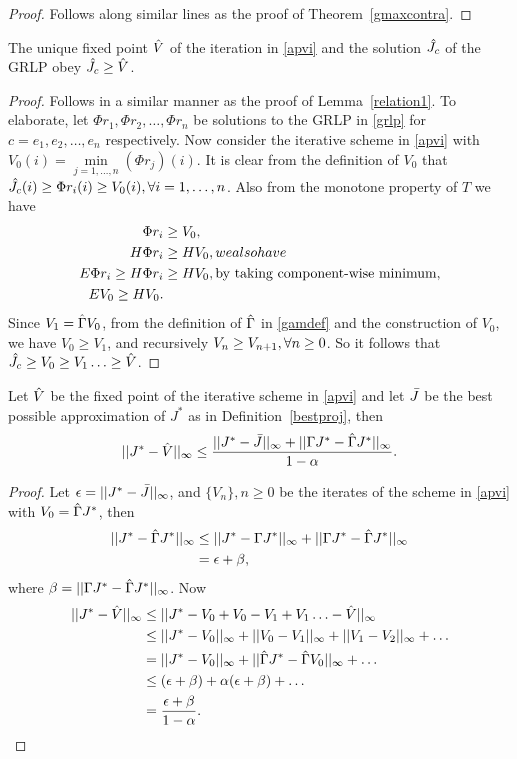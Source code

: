 \documentclass[12pt,draftcls,onecolumn]{IEEEtran}
\begin{document}
\begin{proof}
Follows along similar lines as the proof of Theorem~\ref{gmaxcontra}.
\end{proof}
\begin{lemma}\label{relation2}
The unique fixed point $\hat{V}$ of the iteration in \eqref{apvi} and the solution $\hat{J}_c$ of the GRLP obey $\hat{J}_c\geq\hat{V}$.
\end{lemma}
\begin{proof}
Follows in a similar manner as the proof of Lemma~\ref{relation1}. To elaborate, let $\Phi r_1, \Phi r_2,\ldots,\Phi r_n$ be solutions to the GRLP in \eqref{grlp} for $c=e_1, e_2,\ldots,e_n$ respectively. Now consider the iterative scheme in \eqref{apvi} with $V_0(i)=\underset{j=1,\ldots,n}{\min}(\Phi r_j)(i)$. It is clear from the definition of $V_0$ that $\hat{J}_c(i)\geq\Phi r_i(i)\geq V_0(i), \relax{ } \forall i=1,\ldots,n$. Also from the monotone property of $T$ we have 
\begin{align}
\Phi r_i&\geq V_0,\nonumber\\
H\Phi r_i&\geq H V_0,\relax{we also have}\nonumber\\
E\Phi r_i\geq H\Phi r_i&\geq HV_0,\relax{ }\text{by taking component-wise minimum},\nonumber\\
E V_0\geq H V_0.
\end{align}
Since $V_1=\hat{\Gamma} V_0$, from the definition of $\hat{\Gamma}$ in \eqref{gamdef} and the construction of $V_0$, we have $V_0\geq V_1$, and recursively $V_{n}\geq V_{n+1}, \relax{ }\forall n\geq 0$. So it follows that $\hat{J}_c\geq V_0\geq V_1\ldots\geq \hat{V}$.
\end{proof}
\begin{theorem}\label{mt1}
Let $\hat{V}$ be the fixed point of the iterative scheme in \eqref{apvi} and let $\bar{J}$ be the best possible approximation of $J^*$ as in Definition~\ref{bestproj}, then
\begin{align}
||J^*-\hat{V}||_\infty\leq \frac{||J^*-\bar{J}||_\infty+||\Gamma J^*-\hat{\Gamma} J^*||_\infty}{1-\alpha}.
\end{align}
\end{theorem}
\begin{proof}
Let $\epsilon=||J^*-\bar{J}||_\infty$, and $\{V_n\},n\geq 0$ be the iterates of the scheme in \eqref{apvi} with $V_0=\hat{\Gamma} J^*$, then
\begin{align}
||J^*-\hg J^*||_\infty&\leq||J^*-\Gamma J^*||_\infty+||\Gamma J^*-\hg J^*||_\infty\nn\\\vspace{10pt}
&= \epsilon+\beta,
\end{align}
where $\beta=||\Gamma J^*-\hat{\Gamma} J^*||_\infty$. Now
\begin{align}
||J^*-\hv||_\infty&\leq ||J^*-V_0+V_0-V_1+V_1\ldots-\hv||_\infty\nn\\
&\leq ||J^*-V_0||_\infty+||V_0-V_1||_\infty+||V_1-V_2||_\infty+\ldots\nn\\
&=||J^*-V_0||_\infty+||\hg J^*-\hg V_0||_\infty+\ldots\nn\\\vspace{10pt}
&\leq (\epsilon+\beta)+\alpha(\epsilon+\beta)+\ldots\nn\\
&=\frac{\epsilon+\beta}{1-\alpha}.
\end{align}
\end{proof}
\end{document}
